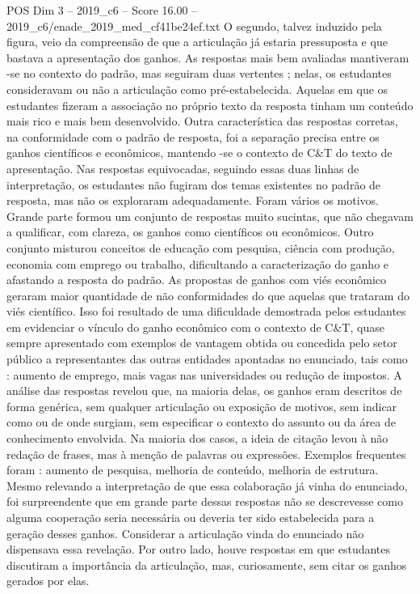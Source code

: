 \begin{textsample}{POS Dim 3 – 2019\_c6 – Score 16.00 – 2019\_c6/enade\_2019\_med\_cf41be24ef.txt}
O segundo, talvez induzido pela figura, veio da compreensão de que a articulação já estaria pressuposta e que bastava a apresentação dos ganhos.
As respostas mais bem avaliadas mantiveram -se no contexto do padrão, mas seguiram duas vertentes ; nelas, os estudantes consideravam ou não a articulação como pré-estabelecida.
Aquelas em que os estudantes fizeram a associação no próprio texto da resposta tinham um conteúdo mais rico e mais bem desenvolvido.
Outra característica das respostas corretas, na conformidade com o padrão de resposta, foi a separação precisa entre os ganhos científicos e econômicos, mantendo -se o contexto de C\&T do texto de apresentação.
Nas respostas equivocadas, seguindo essas duas linhas de interpretação, os estudantes não fugiram dos temas existentes no padrão de resposta, mas não os exploraram adequadamente.
Foram vários os motivos.
Grande parte formou um conjunto de respostas muito sucintas, que não chegavam a qualificar, com clareza, os ganhos como científicos ou econômicos.
Outro conjunto misturou conceitos de educação com pesquisa, ciência com produção, economia com emprego ou trabalho, dificultando a caracterização do ganho e afastando a resposta do padrão.
As propostas de ganhos com viés econômico geraram maior quantidade de não conformidades do que aquelas que trataram do viés científico.
Isso foi resultado de uma dificuldade demostrada pelos estudantes em evidenciar o vínculo do ganho econômico com o contexto de C\&T, quase sempre apresentado com exemplos de vantagem obtida ou concedida pelo setor público a representantes das outras entidades apontadas no enunciado, tais como : aumento de emprego, mais vagas nas universidades ou redução de impostos.
A análise das respostas revelou que, na maioria delas, os ganhos eram descritos de forma genérica, sem qualquer articulação ou exposição de motivos, sem indicar como ou de onde surgiam, sem especificar o contexto do assunto ou da área de conhecimento envolvida.
Na maioria dos casos, a ideia de citação levou à não redação de frases, mas à menção de palavras ou expressões.
Exemplos frequentes foram : aumento de pesquisa, melhoria de conteúdo, melhoria de estrutura.
Mesmo relevando a interpretação de que essa colaboração já vinha do enunciado, foi surpreendente que em grande parte dessas respostas não se descrevesse como alguma cooperação seria necessária ou deveria ter sido estabelecida para a geração desses ganhos.
Considerar a articulação vinda do enunciado não dispensava essa revelação.
Por outro lado, houve respostas em que estudantes discutiram a importância da articulação, mas, curiosamente, sem citar os ganhos gerados por elas.

\end{textsample}
